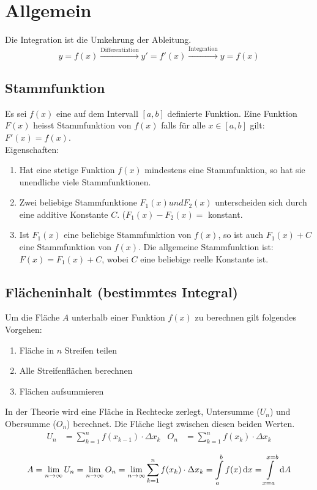 \section{Allgemein}
Die Integration ist die Umkehrung der Ableitung.
\begin{equation*}
	y = f(x) \xrightarrow{\mbox{Differentiation}} y' = f'(x) \xrightarrow{\mbox{Integration}} y = f(x) 
\end{equation*}

\subsection{Stammfunktion}
Es sei $f(x)$ eine auf dem Intervall $[a, b]$ definierte Funktion. Eine Funktion $F(x)$ heisst Stammfunktion
von $f(x)$ falls für alle $x \in [a, b]$ gilt: $F'(x) = f(x)$.\\
Eigenschaften:
\begin{enumerate}\itemsep0em
	\item Hat eine stetige Funktion $f(x)$ mindestens eine Stammfunktion, so hat sie unendliche viele Stammfunktionen.
	\item Zwei beliebige Stammfunktione $F_1(x) und F_2(x)$ unterscheiden sich durch eine additive Konstante $C$. ($F_1(x) - F_2(x) = $ konstant.
	\item Ist $F_1(x)$ eine beliebige Stammfunktion von $f(x)$, so ist auch $F_1(x) + C$ eine Stammfunktion von $f(x)$.
	Die allgemeine Stammfunktion ist: $F(x) = F_1(x) + C$, wobei $C$ eine beliebige reelle Konstante ist.
\end{enumerate}

\subsection{Flächeninhalt (bestimmtes Integral)}
Um die Fläche $A$ unterhalb einer Funktion $f(x)$ zu berechnen gilt folgendes Vorgehen:
\begin{enumerate}\itemsep0em
	\item Fläche in $n$ Streifen teilen
	\item Alle Streifenflächen berechnen
	\item Flächen aufsummieren
\end{enumerate}

In der Theorie wird eine Fläche in Rechtecke zerlegt, Untersumme ($U_n$) und Obersumme ($O_n$) berechnet. Die Fläche liegt zwischen diesen beiden Werten.
\begin{align*}
	U_n& = \sum_{k=1}^n f(x_{k-1}) \cdot \Delta x_k &   
	O_n& = \sum_{k=1}^n f(x_{k}) \cdot \Delta x_k\\
\end{align*}
\begin{equation*}
	A = \lim_{n \rightarrow \infty} U_n = \lim_{n \rightarrow \infty} O_n = \lim_{n \rightarrow \infty} \sum_{k=1}^n f(x_k) \cdot \Delta x_k = \int\limits_a^b f(x)\,\mathrm dx = \int\limits_{x=a}^{x=b} \,\mathrm dA
\end{equation*}

